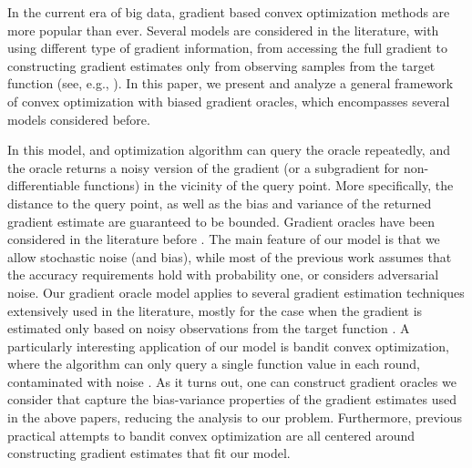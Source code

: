 In the current era of big data, gradient based convex optimization methods are more popular than ever. Several models are considered in the literature, with using different type of gradient information, from accessing the full gradient to constructing gradient estimates only from observing samples from the target function (see, e.g., \citealp{nesterov2004introductory,DeGliNe14,HaLe14:SOC,PoTsy90,flaxman2005online,AbHaRa08,AgDeXi10,Ne11:TR,AgFoHsuKaRa13:SIAM,katkul,kushcla,spall1992multivariate,spall1997one,Dip03:AoS,bhatnagar-book,duchi2015optimal}). In this paper, we present and analyze a general framework of convex optimization with biased gradient oracles, which encompasses several models considered before.

In this model, and optimization algorithm can query the oracle repeatedly, and the oracle returns a noisy version of the gradient (or a subgradient for non-differentiable functions) in the vicinity of the query point. More specifically, the distance to the query point, as well as the bias and variance of the returned gradient estimate are guaranteed to be bounded. Gradient oracles have been considered in the literature before \citep{dAsp08,Baes09,SchRoBa11,DeGliNe14}. The main feature of our model is that we allow stochastic noise (and bias), while most of the previous work assumes that the accuracy requirements hold with probability one, or considers adversarial noise. Our gradient oracle model applies to several gradient estimation techniques extensively used in the literature, mostly for the case when the gradient is estimated only based on noisy observations from the target function \citep{katkul,kushcla,spall1992multivariate,spall1997one,Dip03:AoS,bhatnagar-book,duchi2015optimal}. A particularly interesting application of our model is bandit convex optimization, where the algorithm can only query a single function value in each round, contaminated with noise \citep{PoTsy90,flaxman2005online,AbHaRa08,AgDeXi10,Ne11:TR,AgFoHsuKaRa13:SIAM,HaLe14:SOC}. As it turns out, one can construct gradient oracles we consider that capture the bias-variance properties of the gradient estimates used in the above papers, reducing the analysis to our problem. Furthermore, previous practical attempts to bandit convex optimization are all centered around constructing gradient estimates that fit our model.

